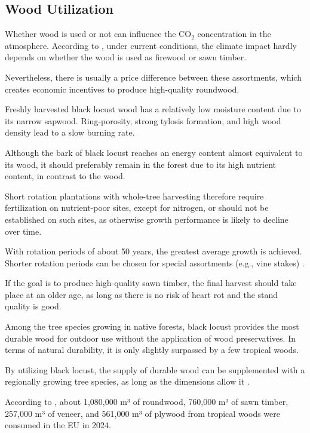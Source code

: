 \subsection{Wood Utilization}

Whether wood is used or not can influence the CO$_2$ concentration in the atmosphere. According to \citet{boiger2024schnittholzBrennholz}, under current conditions, the climate impact hardly depends on whether the wood is used as firewood or sawn timber.

Nevertheless, there is usually a price difference between these assortments, which creates economic incentives to produce high-quality roundwood.

Freshly harvested black locust wood has a relatively low moisture content due to its narrow sapwood. Ring-porosity, strong tylosis formation, and high wood density lead to a slow burning rate.

Although the bark of black locust reaches an energy content almost equivalent to its wood, it should preferably remain in the forest due to its high nutrient content, in contrast to the wood.

Short rotation plantations with whole-tree harvesting therefore require fertilization on nutrient-poor sites, except for nitrogen, or should not be established on such sites, as otherwise growth performance is likely to decline over time.

With rotation periods of about 50 years, the greatest average growth is achieved. Shorter rotation periods can be chosen for special assortments (e.g., vine stakes) \citep[p.~136]{erteld1952robinieErtrag}.

If the goal is to produce high-quality sawn timber, the final harvest should take place at an older age, as long as there is no risk of heart rot and the stand quality is good.

Among the tree species growing in native forests, black locust provides the most durable wood for outdoor use without the application of wood preservatives. In terms of natural durability, it is only slightly surpassed by a few tropical woods.

By utilizing black locust, the supply of durable wood can be supplemented with a regionally growing tree species, as long as the dimensions allow it \citep{benthien2020robinieTropenholz,sari2005robinienholz}.

According to \citet{itto2024biennial}, about 1,080,000 m³ of roundwood, 760,000 m³ of sawn timber, 257,000 m³ of veneer, and 561,000 m³ of plywood from tropical woods were consumed in the EU in 2024.

